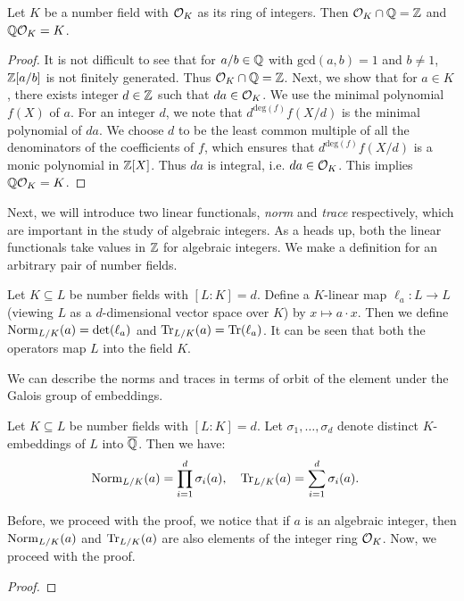 \documentclass[11pt]{article}
\begin{document}
\begin{lemma}\label{lem:roi-q-intersection}
Let $K$ be a number field with $\mathcal{O}_{K}$ as its ring of integers. Then $\mathcal{O}_{K}\cap \mathbb{Q}=\mathbb{Z}$ and
$\mathbb{Q} \mathcal{O}_{K}=K$.
\end{lemma}
\begin{proof}
It is not difficult to see that for $a/b\in \mathbb{Q}$ with $\mathrm{gcd}(a,b)=1$ and $b\neq 1$, $\mathbb{Z}[a/b]$ is not
finitely generated. Thus $\mathcal{O}_{K}\cap \mathbb{Q}=\mathbb{Z}$. Next, we show that for $a\in K$, there exists integer $d\in \mathbb{Z}$
such that $da\in \mathcal{O}_{K}$. We use the minimal polynomial $f(X)$ of $a$. For an integer $d$, we note that
$d^{\mathrm{deg}(f)}f(X/d)$ is the minimal polynomial of $da$. We choose $d$ to be the least common multiple of
all the denominators of the coefficients of $f$, which ensures that $d^{\mathrm{deg}(f)}f(X/d)$ is a monic polynomial
in $\mathbb{Z}[X]$. Thus $da$ is integral, i.e. $da\in \mathcal{O}_{K}$. This implies $\mathbb{Q} \mathcal{O}_{K}=K$.
\end{proof}

Next, we will introduce two linear functionals, {\em norm} and {\em trace} respectively, which are important in
the study of algebraic integers. As a heads up, both the linear functionals take values in $\mathbb{Z}$ for algebraic
integers. We make a definition for an arbitrary pair of number fields.

\begin{definition}\label{defn:norm-and-trace}
Let $K\subseteq L$ be number fields with $[L:K]=d$. Define a $K$-linear map $\ell_a: L\rightarrow L$ (viewing
$L$ as a $d$-dimensional vector space over $K$) by $x\mapsto a\cdot x$. Then we define $\mathrm{Norm}_{L/{K}}(a)=\mathrm{det}({\ell_a})$ and
$\mathrm{Tr}_{L/{K}}(a)=\mathrm{Tr}(\ell_a)$. It can be seen that both the operators map $L$ into the field $K$.
\end{definition}

We can describe the norms and traces in terms of orbit of the element under the Galois group of embeddings.

\begin{lemma}\label{lem:norm-and-trace}
Let $K\subseteq L$ be number fields with $[L:K]=d$. Let $\sigma_1,\ldots,\sigma_d$ denote distinct $K$-embeddings
of $L$ into $\overline{\mathbb{Q}}$. Then we have:
\begin{align*}
\mathrm{Norm}_{L/{K}}(a) = \prod_{i=1}^d \sigma_i(a), \quad \mathrm{Tr}_{L/{K}}(a) &= \sum_{i=1}^d \sigma_i(a).
\end{align*}
\end{lemma}
Before, we proceed with the proof, we notice that if $a$ is an algebraic integer, then $\mathrm{Norm}_{L/{K}}(a)$
and $\mathrm{Tr}_{L/{K}}(a)$ are also elements of the integer ring $\mathcal{O}_{K}$. Now, we proceed with the proof.
\begin{proof}

\end{proof}
\end{document}
